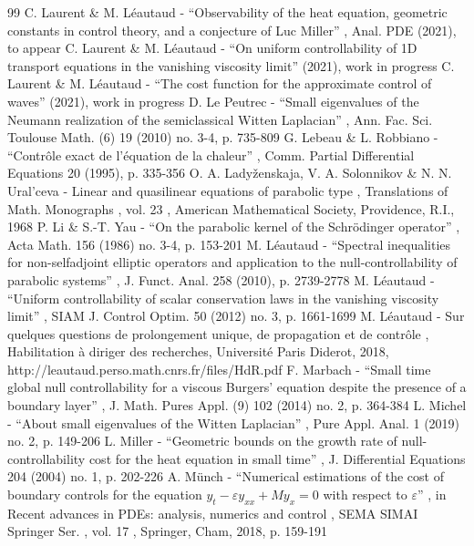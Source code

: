 \documentclass[10pt]{amsart}
\theoremstyle{definition}
\begin{document}
\begin{thebibliography}{99}
 C. Laurent \& M. Léautaud - “Observability of the heat equation, geometric constants in control theory, and a conjecture of Luc Miller” , Anal. PDE (2021), to appear
 C. Laurent \& M. Léautaud - “On uniform controllability of 1D transport equations in the vanishing viscosity limit” (2021), work in progress
 C. Laurent \& M. Léautaud - “The cost function for the approximate control of waves” (2021), work in progress
 D. Le Peutrec - “Small eigenvalues of the Neumann realization of the semiclassical Witten Laplacian” , Ann. Fac. Sci. Toulouse Math. (6) 19 (2010) no. 3-4, p. 735-809
 G. Lebeau \& L. Robbiano - “Contrôle exact de l’équation de la chaleur” , Comm. Partial Differential Equations 20 (1995), p. 335-356
 O. A. Ladyženskaja, V. A. Solonnikov \& N. N. Ural’ceva - Linear and quasilinear equations of parabolic type , Translations of Math. Monographs , vol. 23 , American Mathematical Society, Providence, R.I., 1968
 P. Li \& S.-T. Yau - “On the parabolic kernel of the Schrödinger operator” , Acta Math. 156 (1986) no. 3-4, p. 153-201
 M. Léautaud - “Spectral inequalities for non-selfadjoint elliptic operators and application to the null-controllability of parabolic systems” , J. Funct. Anal. 258 (2010), p. 2739-2778
 M. Léautaud - “Uniform controllability of scalar conservation laws in the vanishing viscosity limit” , SIAM J. Control Optim. 50 (2012) no. 3, p. 1661-1699
 M. Léautaud - Sur quelques questions de prolongement unique, de propagation et de contrôle , Habilitation à diriger des recherches, Université Paris Diderot, 2018, http://leautaud.perso.math.cnrs.fr/files/HdR.pdf
 F. Marbach - “Small time global null controllability for a viscous Burgers’ equation despite the presence of a boundary layer” , J. Math. Pures Appl. (9) 102 (2014) no. 2, p. 364-384
 L. Michel - “About small eigenvalues of the Witten Laplacian” , Pure Appl. Anal. 1 (2019) no. 2, p. 149-206
 L. Miller - “Geometric bounds on the growth rate of null-controllability cost for the heat equation in small time” , J. Differential Equations 204 (2004) no. 1, p. 202-226
 A. Münch - “Numerical estimations of the cost of boundary controls for the equation $y_t-\varepsilon y_{xx}+My_x=0$ with respect to $\varepsilon $” , in Recent advances in PDEs: analysis, numerics and control , SEMA SIMAI Springer Ser. , vol. 17 , Springer, Cham, 2018, p. 159-191

\end{thebibliography}
\end{document}
